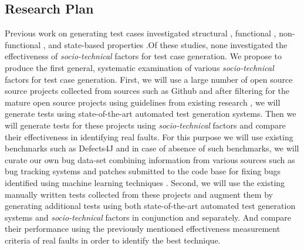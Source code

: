 \documentclass[10pt]{article}
\begin{document}
\subsection{Research Plan}

 Previous work on generating test cases investigated structural \cite{tonella2004evolutionary}, functional \cite{wegener2004evaluation}, non-functional \cite{wegener1998verifying}, and state-based properties \cite{oh2011transition}.Of these studies, none investigated the effectiveness of \emph{socio-technical} factors for test case generation. We propose to produce the first general, systematic examination of various \emph{socio-technical} factors for test case generation. First, we will use a large number of open source source projects collected from sources such as Github and after filtering for the mature open source projects using guidelines from existing research \cite{kalliamvakou2014promises}, we will generate tests using state-of-the-art automated test generation systems. Then we will generate tests for these projects using \emph{socio-technical} factors and compare their effectiveness in identifying real faults. For this purpose we will use existing benchmarks such as Defects4J \cite{just2014defects4j} and in case of absence of such benchmarks, we will curate our own bug data-set combining information from various sources such as bug tracking systems and patches submitted to the code base for fixing bugs identified using machine learning techniques \cite{ahmed2016can}. Second, we will use the existing manually written 
tests collected from these projects and augment them by generating additional tests using both state-of-the-art automated test generation systems and \emph{socio-technical} factors in conjunction and separately. And compare their performance using the previously mentioned effectiveness measurement criteria of real faults in order to identify the best technique.
\end{document}

